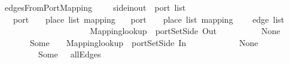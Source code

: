 \ edgesFromPortMapping\ {\isacharcolon}{\isacharcolon}\ {\isachardoublequoteopen}\ {\isacharparenleft}\ {\isacharcolon}{\isacharcolon}\ side{\isacharunderscore}in{\isacharunderscore}out{\isacharcomma}\ \ port\ list\isanewline
{}\ {\isacharparenleft}{\isacharparenleft}\ \ port{\isacharcomma}\ {\isacharparenleft}\ \ \ place\ list{\isacharparenright}\ mapping\isanewline
{}\ {\isacharparenleft}{\isacharparenleft}\ \ port{\isacharcomma}\ {\isacharparenleft}\ \ \ place\ list{\isacharparenright}\ mapping\isanewline
{}\ {\isacharparenleft}\ \ \ edge\ list{\isachardoublequoteclose}\isanewline
\ \ \isanewline
\ \ \ \ {\isachardoublequoteopen}\ {\isacharbrackleft}{\isacharbrackright}\ \ {\isacharequal}\ {\isacharbrackleft}{\isacharbrackright}{\isachardoublequoteclose}\isanewline
\ \ {\isacharbar}\ {\isachardoublequoteopen}\ {\isacharparenleft}\ \ {\isacharequal}\isanewline
\ \ \ \ {\isacharparenleft}\ \ Mapping{\isachardot}lookup\ \ {\isacharparenleft}portSetSide\ Out\ \ \isanewline
\ \ \ \ \ \ \ \ None\ {\isasymRightarrow}\ {\isacharbrackleft}{\isacharbrackright}\isanewline
\ \ \ \ \ \ {\isacharbar}\ Some\ \ {\isasymRightarrow}\ {\isacharparenleft}\ Mapping{\isachardot}lookup\ \ {\isacharparenleft}portSetSide\ In\ \ \isanewline
\ \ \ \ \ \ \ \ \ \ None\ {\isasymRightarrow}\ {\isacharbrackleft}{\isacharbrackright}\isanewline
\ \ \ \ \ \ \ \ {\isacharbar}\ Some\ \ {\isasymRightarrow}\ allEdges\ \isanewline
\ \ \ \ {\isacharat}\ \ 
